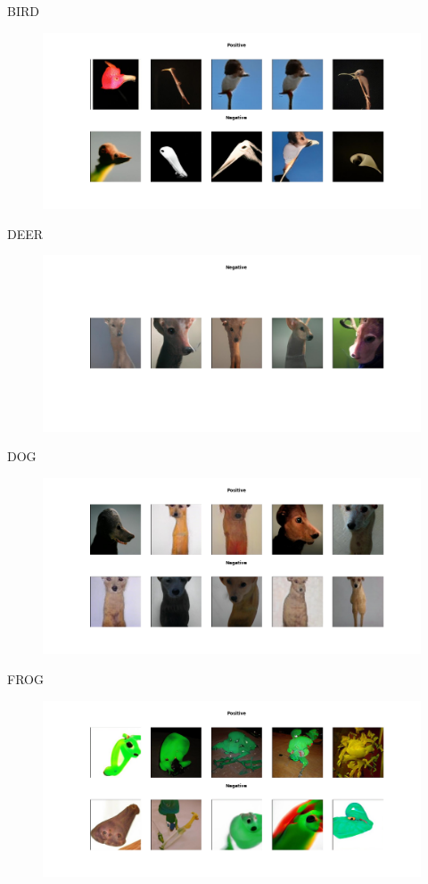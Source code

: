 \documentclass[11pt,a4paper,openany]{book}
\begin{document}
\newline
BIRD
\begin{figure}[ht!]
    \centering
    \includegraphics[scale=0.4]{figs/cifar10_examples/bird.png}
\end{figure}
\newpage
\noindent DEER
\begin{figure}[ht!]
    \centering
    \includegraphics[scale=0.4]{figs/cifar10_examples/deer.png}
\end{figure}
\newline
DOG
\begin{figure}[ht!]
    \centering
    \includegraphics[scale=0.4]{figs/cifar10_examples/dog.png}
\end{figure}
\newpage
\noindent FROG
\begin{figure}[ht!]
    \centering
    \includegraphics[scale=0.4]{figs/cifar10_examples/frog.png}
\end{figure}
\end{document}
